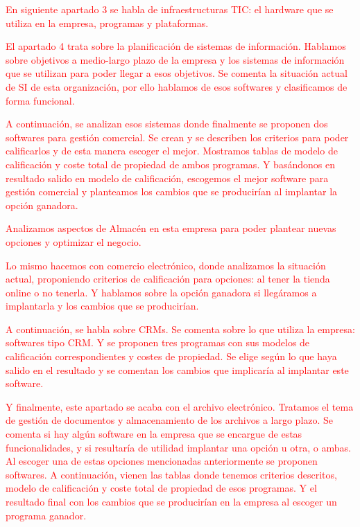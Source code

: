 \documentclass{article}
\begin{document}
\textcolor{Red}{En siguiente apartado 3 se habla de infraestructuras TIC: el hardware que se utiliza en la empresa, programas y plataformas.} 

\textcolor{Red}{El apartado 4 trata sobre la planificación de sistemas de información. Hablamos sobre objetivos a medio-largo plazo de la empresa y los sistemas de información que se utilizan para poder llegar a esos objetivos. Se comenta la situación actual de SI de esta organización, por ello hablamos de esos softwares y clasificamos de forma funcional.} 

\textcolor{Red}{A continuación, se analizan esos sistemas donde finalmente se proponen dos softwares para gestión comercial. Se crean y se describen los criterios para poder calificarlos y de esta manera escoger el mejor. Mostramos tablas de modelo de calificación y coste total de propiedad de ambos programas. Y basándonos en resultado salido en modelo de calificación, escogemos el mejor software para gestión comercial y planteamos los cambios que se producirían al implantar la opción ganadora.} 

\textcolor{Red}{Analizamos aspectos de Almacén en esta empresa para poder plantear nuevas opciones y optimizar el negocio. }  

\textcolor{Red}{Lo mismo hacemos con comercio electrónico, donde analizamos la situación actual, proponiendo criterios de calificación para opciones: al tener la tienda online o no tenerla. Y hablamos sobre la opción ganadora si llegáramos a implantarla y los cambios que se producirían.}  

\textcolor{Red}{A continuación, se habla sobre CRMs. Se comenta sobre lo que utiliza la empresa: softwares tipo CRM. Y se proponen tres programas con sus modelos de calificación correspondientes y costes de propiedad. Se elige según lo que haya salido en el resultado y se comentan los cambios que implicaría al implantar este software.}  

\textcolor{Red}{Y finalmente, este apartado se acaba con el archivo electrónico. Tratamos el tema de gestión de documentos y almacenamiento de los archivos a largo plazo. Se comenta si hay algún software en la empresa que se encargue de estas funcionalidades, y si resultaría de utilidad implantar una opción u otra, o ambas.  Al escoger una de estas opciones mencionadas anteriormente se proponen softwares. A continuación, vienen las tablas donde tenemos criterios descritos, modelo de calificación y coste total de propiedad de esos programas. Y el resultado final con los cambios que se producirían en la empresa al escoger un programa ganador.}
\end{document}
